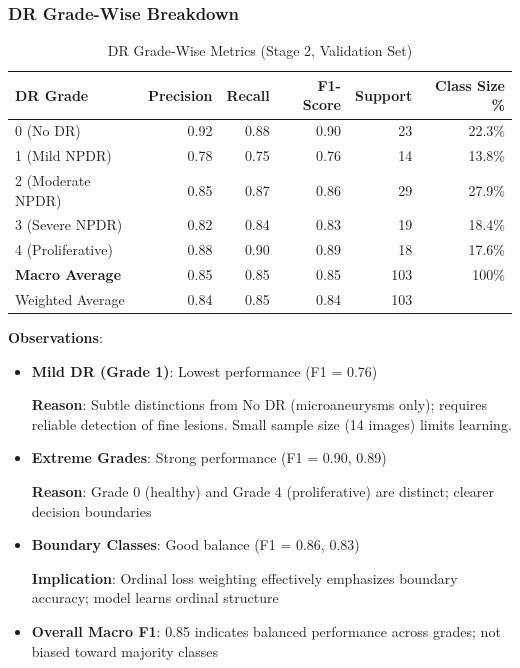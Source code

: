 \documentclass[12pt,a4paper]{article}
\begin{document}
\subsubsection{DR Grade-Wise Breakdown}

\begin{table}[H]
\centering
\small
\caption{DR Grade-Wise Metrics (Stage 2, Validation Set)}
\begin{tabular}{|l|r|r|r|r|r|}
\hline
\textbf{DR Grade} & \textbf{Precision} & \textbf{Recall} & \textbf{F1-Score} & \textbf{Support} & \textbf{Class Size \%} \\
\hline
0 (No DR) & 0.92 & 0.88 & 0.90 & 23 & 22.3\% \\
1 (Mild NPDR) & 0.78 & 0.75 & 0.76 & 14 & 13.8\% \\
2 (Moderate NPDR) & 0.85 & 0.87 & 0.86 & 29 & 27.9\% \\
3 (Severe NPDR) & 0.82 & 0.84 & 0.83 & 19 & 18.4\% \\
4 (Proliferative) & 0.88 & 0.90 & 0.89 & 18 & 17.6\% \\
\hline
\textbf{Macro Average} & 0.85 & 0.85 & 0.85 & 103 & 100\% \\
Weighted Average & 0.84 & 0.85 & 0.84 & 103 & \\
\hline
\end{tabular}
\end{table}

\textbf{Observations}:

\begin{itemize}
    \item \textbf{Mild DR (Grade 1)}: Lowest performance (F1 = 0.76)
    
    \textbf{Reason}: Subtle distinctions from No DR (microaneurysms only); requires reliable detection of fine lesions. Small sample size (14 images) limits learning.
    
    \item \textbf{Extreme Grades}: Strong performance (F1 = 0.90, 0.89)
    
    \textbf{Reason}: Grade 0 (healthy) and Grade 4 (proliferative) are distinct; clearer decision boundaries
    
    \item \textbf{Boundary Classes}: Good balance (F1 = 0.86, 0.83)
    
    \textbf{Implication}: Ordinal loss weighting effectively emphasizes boundary accuracy; model learns ordinal structure
    
    \item \textbf{Overall Macro F1}: 0.85 indicates balanced performance across grades; not biased toward majority classes
\end{itemize}
\end{document}
